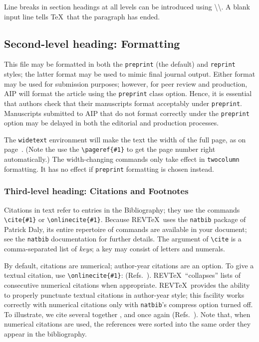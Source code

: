 \documentclass[%
 aip,
 jmp,%
 amsmath,amssymb,
 reprint,%
]{revtex4-1}
\begin{document}
Line breaks in section headings at all levels can be introduced using
\textbackslash\textbackslash. A blank input line tells \TeX\ that the
paragraph has ended. 

\subsection{\label{sec:level2}Second-level heading: Formatting}

This file may be formatted in both the \texttt{preprint} (the default) and
\texttt{reprint} styles; the latter format may be used to 
mimic final journal output. Either format may be used for submission
purposes; however, for peer review and production, AIP will format the
article using the \texttt{preprint} class option. Hence, it is
essential that authors check that their manuscripts format acceptably
under \texttt{preprint}. Manuscripts submitted to AIP that do not
format correctly under the \texttt{preprint} option may be delayed in
both the editorial and production processes.

The \texttt{widetext} environment will make the text the width of the
full page, as on page~\pageref{eq:wideeq}. (Note the use the
\verb+\pageref{#1}+ to get the page number right automatically.) The
width-changing commands only take effect in \texttt{twocolumn}
formatting. It has no effect if \texttt{preprint} formatting is chosen
instead.

\subsubsection{\label{sec:level3}Third-level heading: Citations and Footnotes}

Citations in text refer to entries in the Bibliography;
they use the commands \verb+\cite{#1}+ or \verb+\onlinecite{#1}+. 
Because REV\TeX\ uses the \verb+natbib+ package of Patrick Daly, 
its entire repertoire of commands are available in your document;
see the \verb+natbib+ documentation for further details.
The argument of \verb+\cite+ is a comma-separated list of \emph{keys};
a key may consist of letters and numerals. 

By default, citations are numerical; \cite{feyn54} author-year citations are an option. 
To give a textual citation, use \verb+\onlinecite{#1}+: (Refs.~). 
REV\TeX\ ``collapses'' lists of consecutive numerical citations when appropriate. 
REV\TeX\ provides the ability to properly punctuate textual citations in author-year style;
this facility works correctly with numerical citations only with \texttt{natbib}'s compress option turned off. 
To illustrate, we cite several together \cite{feyn54,witten2001,epr,Berman1983}, 
and once again (Refs.~). 
Note that, when numerical citations are used, the references were sorted into the same order they appear in the bibliography. 
\end{document}
